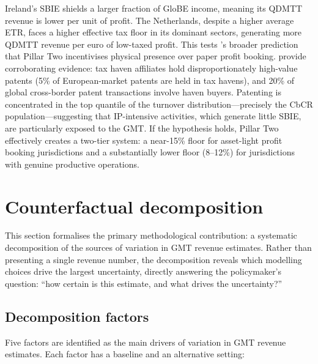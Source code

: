 \documentclass[11pt,a4paper]{article}
\begin{document}
Ireland's SBIE shields a larger fraction of GloBE income, meaning its QDMTT revenue is lower per unit of profit. The Netherlands, despite a higher average ETR, faces a higher effective tax floor in its dominant sectors, generating more QDMTT revenue per euro of low-taxed profit. This tests \citeauthor{schjelderup2024}'s broader prediction that Pillar Two incentivises physical presence over paper profit booking. \citet{bilicka2023} provide corroborating evidence: tax haven affiliates hold disproportionately high-value patents (5\% of European-market patents are held in tax havens), and 20\% of global cross-border patent transactions involve haven buyers. Patenting is concentrated in the top quantile of the turnover distribution---precisely the CbCR population---suggesting that IP-intensive activities, which generate little SBIE, are particularly exposed to the GMT. If the hypothesis holds, Pillar Two effectively creates a two-tier system: a near-15\% floor for asset-light profit booking jurisdictions and a substantially lower floor (8--12\%) for jurisdictions with genuine productive operations.

\section{Counterfactual decomposition}\label{sec:decomposition}

This section formalises the primary methodological contribution: a systematic decomposition of the sources of variation in GMT revenue estimates. Rather than presenting a single revenue number, the decomposition reveals which modelling choices drive the largest uncertainty, directly answering the policymaker's question: ``how certain is this estimate, and what drives the uncertainty?''

\subsection{Decomposition factors}\label{sec:factors}

Five factors are identified as the main drivers of variation in GMT revenue estimates. Each factor has a baseline and an alternative setting:
\end{document}
